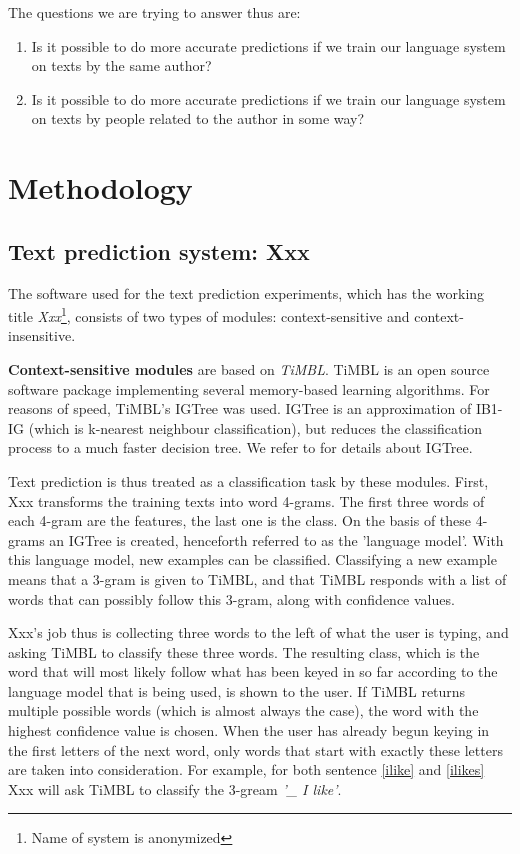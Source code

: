 \documentclass[11pt]{article}
\begin{document}
The questions we are trying to answer thus are:

\begin{enumerate}
\item Is it possible to do more accurate predictions if we train our language system on texts by the same author?
\item Is it possible to do more accurate predictions if we train our language system on texts by people related to the author in some way?
\end{enumerate}

\section{Methodology}

\subsection{Text prediction system: Xxx}

The software used for the text prediction experiments, which has the working title \emph{Xxx}\footnote{Name of system is anonymized}, consists of two types of modules: context-sensitive and context-insensitive. 

\textbf{Context-sensitive modules} are based on \emph{TiMBL}. TiMBL is an open source software package implementing several memory-based learning algorithms. For reasons of speed, TiMBL's IGTree was used. IGTree is an approximation of IB1-IG (which is k-nearest neighbour classification), but reduces the classification process to a much faster decision tree. We refer to  for details about IGTree.

Text prediction is thus treated as a classification task by these modules. First, Xxx transforms the training texts into word 4-grams. The first three words of each 4-gram are the features, the last one is the class. On the basis of these 4-grams an IGTree is created, henceforth referred to as the 'language model'. With this language model, new examples can be classified. Classifying a new example means that a 3-gram is given to TiMBL, and that TiMBL responds with a list of words that can possibly follow this 3-gram, along with confidence values. 

Xxx's job thus is collecting three words to the left of what the user is typing, and asking TiMBL to classify these three words. The resulting class, which is the word that will most likely follow what has been keyed in so far according to the language model that is being used, is shown to the user. If TiMBL returns multiple possible words (which is almost always the case), the word with the highest confidence value is chosen. When the user has already begun keying in the first letters of the next word, only words that start with exactly these letters are taken into consideration. For example, for both sentence \ref{ilike} and \ref{ilikes} Xxx will ask TiMBL to classify the 3-gream \emph{'\_ I like'}.
\end{document}
